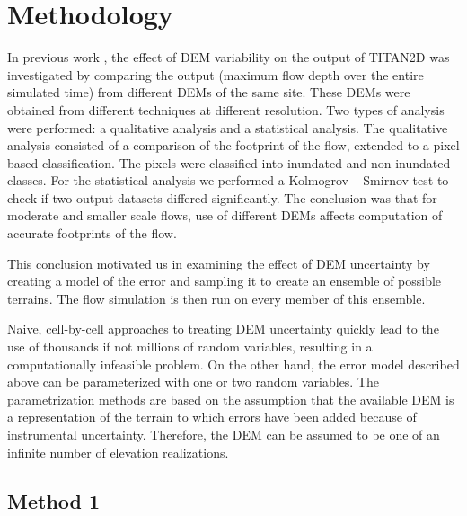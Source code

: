 \documentclass[12pt]{article}
\begin{document}
\section{Methodology}

In previous work \citep{stefanescu1}, the effect of DEM variability on
the output of TITAN2D %
was investigated by comparing the output (maximum flow depth over the
entire simulated time) from different DEMs of the same site.  These
DEMs were obtained from different techniques at different
resolution. Two types of analysis were performed: a qualitative
analysis and a statistical analysis. The qualitative analysis
consisted of a comparison of the footprint of the flow, extended to a
pixel based classification. The pixels were classified into inundated
and non-inundated classes. For the statistical analysis we performed a
Kolmogrov -- Smirnov test to check if two output datasets differed
significantly. The conclusion was that for moderate and smaller scale
flows, use of different DEMs affects computation of accurate
footprints of the flow.

This conclusion motivated us in examining the effect of DEM
uncertainty by creating a model of the error and sampling it to create
an ensemble of possible terrains.  The flow simulation is then run on
every member of this ensemble.

Naive, cell-by-cell approaches to treating DEM uncertainty quickly
lead to the use of thousands if not millions of random variables,
resulting in a computationally infeasible problem.  On the other hand,
the error model described above can be parameterized with one or two
random variables.  The parametrization methods are based on the
assumption that the available DEM is a representation of the terrain
to which errors have been added because of instrumental uncertainty.
Therefore, the DEM can be assumed to be one of an infinite number of
elevation realizations.


\subsection{Method 1}
\label{Method1}
\end{document}
